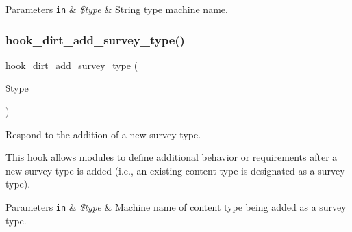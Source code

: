 \begin{DoxyParams}[1]{Parameters}
\mbox{\tt in}  & {\em \$type} & String type machine name. \\
\hline
\end{DoxyParams}
\mbox{\label{dirt_8api_8php_a04e0b3c0458c02ca470655b669bb16c1}} 
\subsubsection{\texorpdfstring{hook\+\_\+dirt\+\_\+add\+\_\+survey\+\_\+type()}{hook\_dirt\_add\_survey\_type()}}
{\footnotesize\ttfamily hook\+\_\+dirt\+\_\+add\+\_\+survey\+\_\+type (\begin{DoxyParamCaption}\item[{}]{\$type }\end{DoxyParamCaption})}

Respond to the addition of a new survey type.

This hook allows modules to define additional behavior or requirements after a new survey type is added (i.\+e., an existing content type is designated as a survey type).


\begin{DoxyParams}[1]{Parameters}
\mbox{\tt in}  & {\em \$type} & Machine name of content type being added as a survey type. \\
\hline
\end{DoxyParams}

